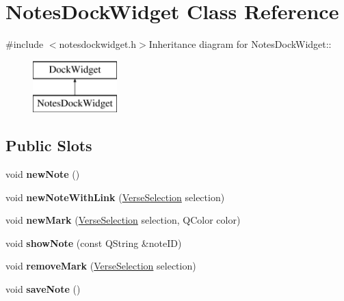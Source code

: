 \hypertarget{classNotesDockWidget}{
\section{NotesDockWidget Class Reference}
\label{classNotesDockWidget}
}


{\ttfamily \#include $<$notesdockwidget.h$>$}Inheritance diagram for NotesDockWidget::\begin{figure}[H]
\begin{center}
\leavevmode
\includegraphics[height=2cm]{classNotesDockWidget}
\end{center}
\end{figure}
\subsection*{Public Slots}
\begin{DoxyCompactItemize}
\item 
\hypertarget{classNotesDockWidget_a61831394a55b15b33285e12f7635a18b}{
void {\bfseries newNote} ()}
\label{classNotesDockWidget_a61831394a55b15b33285e12f7635a18b}

\item 
\hypertarget{classNotesDockWidget_a5338309f3c8f88da4ebec0a691870c02}{
void {\bfseries newNoteWithLink} (\hyperlink{classVerseSelection}{VerseSelection} selection)}
\label{classNotesDockWidget_a5338309f3c8f88da4ebec0a691870c02}

\item 
\hypertarget{classNotesDockWidget_a81644f3bd88ab738a3d1919a2e98382e}{
void {\bfseries newMark} (\hyperlink{classVerseSelection}{VerseSelection} selection, QColor color)}
\label{classNotesDockWidget_a81644f3bd88ab738a3d1919a2e98382e}

\item 
\hypertarget{classNotesDockWidget_a84b7afb87e8f1d3aa46e3fce0f88f1a8}{
void {\bfseries showNote} (const QString \&noteID)}
\label{classNotesDockWidget_a84b7afb87e8f1d3aa46e3fce0f88f1a8}

\item 
\hypertarget{classNotesDockWidget_aeffc894ea15f5944d8943d26d5a9c8d0}{
void {\bfseries removeMark} (\hyperlink{classVerseSelection}{VerseSelection} selection)}
\label{classNotesDockWidget_aeffc894ea15f5944d8943d26d5a9c8d0}

\item 
\hypertarget{classNotesDockWidget_a475c7819f5d1e57cc49a56b1ebd63f33}{
void {\bfseries saveNote} ()}
\label{classNotesDockWidget_a475c7819f5d1e57cc49a56b1ebd63f33}

\end{DoxyCompactItemize}
